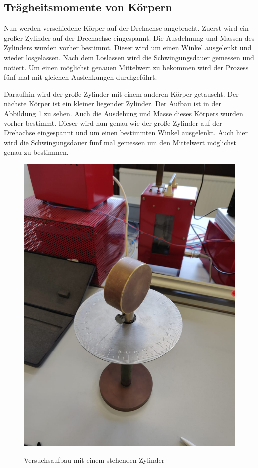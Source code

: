\subsection{Trägheitsmomente von Körpern}
\FloatBarrier
Nun werden verschiedene Körper auf der Drehachse angebracht.
Zuerst wird ein großer Zylinder auf der Drechachse eingespannt.
Die Ausdehnung und Massen des Zylinders wurden vorher bestimmt.
Dieser wird um einen Winkel ausgelenkt und wieder losgelassen.
Nach dem Loslassen wird die Schwingungsdauer gemessen und notiert.
Um einen möglichst genauen Mittelwert zu bekommen wird der Prozess fünf mal mit gleichen Auslenkungen durchgeführt.

Daraufhin wird der große Zylinder mit einem anderen Körper getauscht.
Der nächste Körper ist ein kleiner liegender Zylinder.
Der Aufbau ist in der Abbildung \ref{fig:ZylinderStehend} zu sehen.
Auch die Ausdehung und Masse dieses Körpers wurden vorher bestimmt.
Dieser wird nun genau wie der große Zylinder auf der Drehachse eingespannt und um einen bestimmten Winkel ausgelenkt.
Auch hier wird die Schwingungsdauer fünf mal gemessen um den Mittelwert möglichst genau zu bestimmen.
\FloatBarrier
\begin{figure}
\centering
\caption{Versuchsaufbau mit einem stehenden Zylinder}
\includegraphics[scale=0.1]{content/data/ZylinderStehend.png}
\label{fig:ZylinderStehend}
\end{figure}

